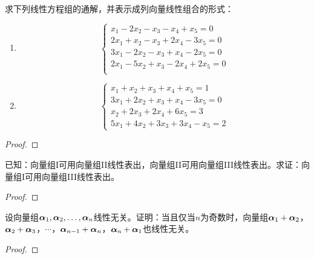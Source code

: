 \begin{problem}\label{problem-2.29}
求下列线性方程组的通解，并表示成列向量线性组合的形式：
\begin{enumerate}
    \item
          {
          \begin{equation*}
              \begin{cases}
                  x_1-2x_2-x_3-x_4+x_5=0    \\
                  2x_1+x_2-x_3+2x_4-3x_5=0  \\
                  3x_1-2x_2-x_3+x_4-2x_5=0  \\
                  2x_1-5x_2+x_3-2x_4+2x_5=0 \\
              \end{cases}
          \end{equation*}
          }
    \item \begin{equation*}
              \begin{cases}
                  x_1+x_2+x_3+x_4+x_5=1    \\
                  3x_1+2x_2+x_3+x_4-3x_5=0 \\
                  x_2+2x_3+2x_4+6x_5=3     \\
                  5x_1+4x_2+3x_3+3x_4-x_5=2
              \end{cases}
          \end{equation*}
\end{enumerate}
\end{problem}
\begin{proof}
\end{proof}

\begin{problem}\label{problem-2.30}
已知：向量组I可用向量组II线性表出，向量组II可用向量组III线性表出。求证：向量组I可用向量组III线性表出。
\end{problem}
\begin{proof}
\end{proof}

\begin{problem}\label{problem-2.31}
设向量组\({\boldsymbol{\alpha}}_1,{\boldsymbol{\alpha}}_2,\dots,{\boldsymbol{\alpha}}_{n}\)线性无关。证明：当且仅当\(n\)为奇数时，向量组\(\boldsymbol{\alpha}_1+\boldsymbol{\alpha}_2\)，\(\boldsymbol{\alpha}_2+\boldsymbol{\alpha}_3\)，\(\cdots\)，\(\boldsymbol{\alpha}_{n-1}+\boldsymbol{\alpha}_n\)，\(\boldsymbol{\alpha}_n+\boldsymbol{\alpha}_1\)也线性无关。
\end{problem}
\begin{proof}
\end{proof}

